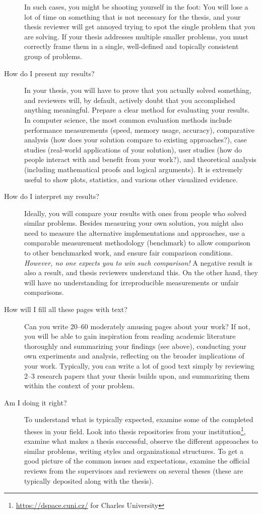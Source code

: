 \begin{description}
In such cases, you might be shooting yourself in the foot: You will lose a lot of time on something that is not necessary for the thesis, and your thesis reviewer will get annoyed trying to spot the single problem that you are solving. If your thesis addresses multiple smaller problems, you must correctly frame them in a single, well-defined and topically consistent group of problems.
\item[How do I present my results?]
In your thesis, you will have to prove that you actually solved something, and reviewers will, by default, actively doubt that you accomplished anything meaningful. Prepare a clear method for evaluating your results. In computer science, the most common evaluation methods include performance measurements (speed, memory usage, accuracy), comparative analysis (how does your solution compare to existing approaches?), case studies (real-world applications of your solution), user studies (how do people interact with and benefit from your work?), and theoretical analysis (including mathematical proofs and logical arguments). It is extremely useful to show plots, statistics, and various other visualized evidence.
\item[How do I interpret my results?]
Ideally, you will compare your results with ones from people who solved similar problems. Besides measuring your own solution, you might also need to measure the alternative implementations and approaches, use a comparable measurement methodology (benchmark) to allow comparison to other benchmarked work, and ensure fair comparison conditions. \emph{However, no one expects you to win such comparison!} A negative result is also a result, and thesis reviewers understand this. On the other hand, they will have no understanding for irreproducible measurements or unfair comparisons.
\item[How will I fill all these pages with text?]
Can you write 20--60 moderately amusing pages about your work? If not, you will be able to gain inspiration from reading academic literature thoroughly and summarizing your findings (see above), conducting your own experiments and analysis, reflecting on the broader implications of your work. Typically, you can write a lot of good text simply by reviewing 2--3 research papers that your thesis builds upon, and summarizing them within the context of your problem.
\item[Am I doing it right?]
To understand what is typically expected, examine some of the completed theses in your field. Look into thesis repositories from your institution\footnote{\url{https://dspace.cuni.cz/} for Charles University}, examine what makes a thesis successful, observe the different approaches to similar problems, writing styles and organizational structures. To get a good picture of the common issues and expectations, examine the official reviews from the supervisors and reviewers on several theses (these are typically deposited along with the thesis).

\end{description}
